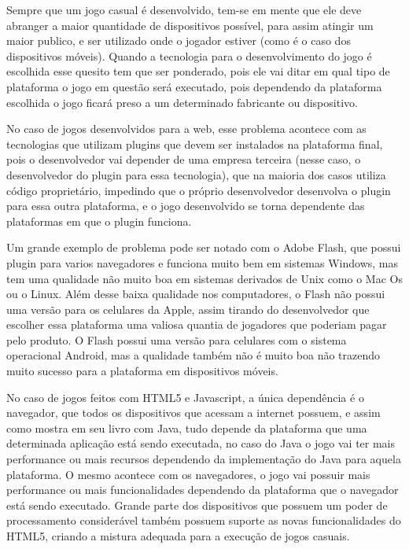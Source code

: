 Sempre que um jogo casual é desenvolvido, tem-se em mente que ele deve
abranger a maior quantidade de dispositivos possível, para assim
atingir um maior publico, e ser utilizado onde o jogador estiver (como
é o caso dos dispositivos móveis). Quando a tecnologia para o
desenvolvimento do jogo é escolhida esse quesito tem que ser
ponderado, pois ele vai ditar em qual tipo de plataforma o jogo em
questão será executado, pois dependendo da plataforma escolhida o jogo ficará preso
a um determinado fabricante ou dispositivo.

No caso de jogos desenvolvidos para a web, esse problema acontece com as
tecnologias que utilizam plugins que devem ser instalados na
plataforma final, pois o desenvolvedor vai depender de uma empresa
terceira (nesse caso, o desenvolvedor do plugin para essa tecnologia),
que na maioria dos casos utiliza código proprietário, impedindo que o
próprio desenvolvedor desenvolva o plugin para essa outra plataforma,
e o jogo desenvolvido se torna dependente das plataformas em que o plugin
funciona.

Um grande exemplo de problema pode ser notado com o Adobe Flash, que possui
plugin para varios navegadores e funciona muito bem em sistemas Windows,
mas tem uma qualidade não muito boa em sistemas derivados de Unix como
o Mac Os ou o Linux. Além desse baixa qualidade nos computadores, o
Flash não possui uma versão para os celulares da Apple, assim tirando
do desenvolvedor que escolher essa plataforma uma valiosa quantia de
jogadores que poderiam pagar pelo produto. O Flash possui uma versão
para celulares com o sistema operacional Android, mas a qualidade
também não é muito boa não trazendo muito sucesso para a plataforma em
dispositivos móveis.


No caso de jogos feitos com HTML5 e Javascript, a única dependência é
o navegador, que todos os dispositivos que acessam a internet possuem,
e assim como  mostra em seu livro com
Java, tudo depende da plataforma que uma determinada aplicação está
sendo executada, no caso do Java o jogo vai ter mais performance ou
mais recursos dependendo da implementação do Java para aquela
plataforma. O mesmo acontece com os navegadores, o jogo vai possuir
mais performance ou mais funcionalidades dependendo da plataforma que
o navegador está sendo executado. Grande parte dos dispositivos que
possuem um poder de processamento considerável também possuem suporte
as novas funcionalidades do HTML5, criando a mistura adequada para a
execução de jogos casuais.

